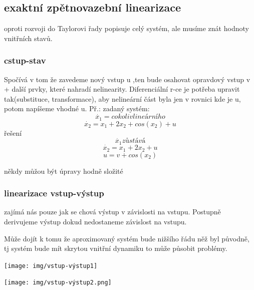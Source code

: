 \subsection{exaktní zpětnovazební linearizace}
oproti rozvoji do Taylorovi řady popisuje celý systém, ale musíme znát hodnoty vnitřních stavů.
\subsubsection{cstup-stav}
Spočívá v tom že zavedeme nový vstup u ,ten bude osahovat opravdový vstup v + další prvky, které nahradí nelinearity.
Diferenciální r-ce je potřeba upravit tak(substituce, transformace), aby nelineární část byla jen v rovnici kde je u, potom napíšeme vhodné u.
Př.:
zadaný systém:
\begin{equation}
    \dot{x_1}=cokoliv lineárního
\end{equation}
\begin{equation*}
    \dot{x_2}=x_1+2x_2+cos(x_2)+u
\end{equation*}
řešení
\begin{equation*}
    \dot{x_1}  zůstává
\end{equation*}
\begin{equation}
    \dot{x_2}=x_1+2x_2+u
\end{equation}
\begin{equation*}
    u=v+cos(x_2)
\end{equation*}

někdy můžou být úpravy hodně složité

\subsubsection{linearizace vstup-výstup}
zajímá nás pouze jak se chová výstup v závislosti na vstupu. Postupně derivujeme výstup dokud nedostaneme závislost na vstupu.

Může dojít k tomu že aproximovaný systém bude nižšího řádu něž byl původně, tj systém bude mít skrytou vnitřní dynamiku to může působit problémy.

\texttt{[image: img/vstup-výstup1]}

\texttt{[image: img/vstup-výstup2.png]}


